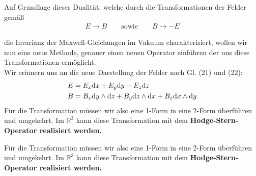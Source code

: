 Auf Grundlage dieser Dualität, welche durch die Transformationen der Felder gemäß
\begin{align*}
E \rightarrow B \qquad \text{sowie} \qquad B \rightarrow -E
\end{align*}

die Invarianz der Maxwell-Gleichungen im Vakuum charakterisiert, wollen wir nun eine neue Methode, genauer einen neuen Operator einführen der uns diese Transformationen ermöglicht. \\
Wir erinnern uns an die neue Darstellung der Felder nach Gl. (21) und (22):
\begin{align*}
E &= E_x \dd x +E_y \dd y + E_z \dd z   \\
B &= B_x \dd y \wedge \dd z + B_y \dd z \wedge \dd x + B_z \dd x \wedge \dd y 
\end{align*}
Für die Transformation müssen wir also eine 1-Form in eine 2-Form überführen und umgekehrt. Im $\mathbb{R}^3$ kann diese Transformation mit dem \bfseries Hodge-Stern-Operator \normalfont realisiert werden.


Für die Transformation müssen wir also eine 1-Form in eine 2-Form überführen und umgekehrt. Im $\mathbb{R}^3$ kann diese Transformation mit dem \bfseries Hodge-Stern-Operator \normalfont realisiert werden.
